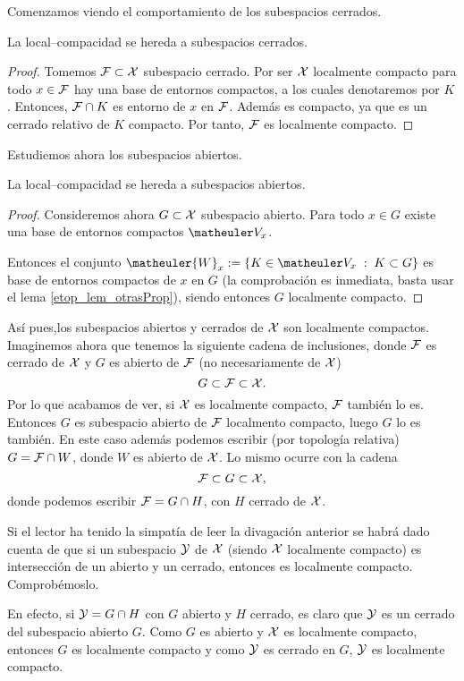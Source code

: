 Comenzamos viendo el comportamiento de los subespacios cerrados.
\begin{lem}
	La local--compacidad se hereda a subespacios cerrados.
\end{lem}
\begin{proof}
	Tomemos $\mathcal{F}\subset\mathcal{X}$ subespacio cerrado. Por ser $\mathcal{X}$ localmente compacto para todo $x\in\mathcal{F}$ hay una base de entornos compactos, a los cuales denotaremos por $K$. Entonces, $\mathcal{F}\cap K$ es entorno de $x$ en $\mathcal{F}$. Además es compacto, ya que es un cerrado relativo de $K$ compacto. Por tanto, $\mathcal{F}$ es localmente compacto.
\end{proof}
Estudiemos ahora los subespacios abiertos.
\begin{lem}
	La local--compacidad se hereda a subespacios abiertos.
\end{lem}
\begin{proof}
	Consideremos ahora $G\subset \mathcal{X}$ subespacio abierto. Para todo $x\in G$ existe una base de entornos compactos $\Va{x}$.
	
	Entonces el conjunto $\matheuler{W}_x:=\{K\in \Va{x}\midc K\subset G\}$
	es base de entornos compactos de $x$ en $G$ (la comprobación es inmediata, basta usar el lema \ref{etop_lem_otrasProp}), siendo entonces $G$ localmente compacto.
\end{proof}
Así pues,los subespacios abiertos y cerrados de $\mathcal{X}$ son localmente compactos. Imaginemos ahora que tenemos la siguiente cadena de inclusiones, donde $\mathcal{F}$ es cerrado de $\mathcal{X}$ y $G$ es abierto de $\mathcal{F}$ (no necesariamente de $\mathcal{X}$)
\[G\subset\mathcal{F}\subset\mathcal{X}.\]
Por lo que acabamos de ver, si $\mathcal{X}$ es localmente compacto, $\mathcal{F}$ también lo es. Entonces $G$ es subespacio abierto de $\mathcal{F}$ localmento compacto, luego $G$ lo es también. En este caso además podemos escribir (por topología relativa) $G=\mathcal{F}\cap W$, donde $W$ es abierto de $\mathcal{X}$. Lo mismo ocurre con la cadena
\[\mathcal{F}\subset G\subset\mathcal{X},\]
donde podemos escribir $\mathcal{F}=G\cap H$, con $H$ cerrado de $\mathcal{X}$.
\begin{obs}
	Si el lector ha tenido la simpatía de leer la divagación anterior se habrá dado cuenta de que si un subespacio $\mathcal{Y}$ de $\mathcal{X}$ (siendo $\mathcal{X}$ localmente compacto) es intersección de un abierto y un cerrado, entonces es localmente compacto. Comprobémoslo.
	
	En efecto, si $\mathcal{Y}=G\cap H$ con $G$ abierto y $H$ cerrado, es claro que $\mathcal{Y}$ es un cerrado del subespacio abierto $G$. Como $G$ es abierto y $\mathcal{X}$ es localmente compacto, entonces $G$ es localmente compacto y como $\mathcal{Y}$ es cerrado en $G$, $\mathcal{Y}$ es localmente compacto.
\end{obs}
